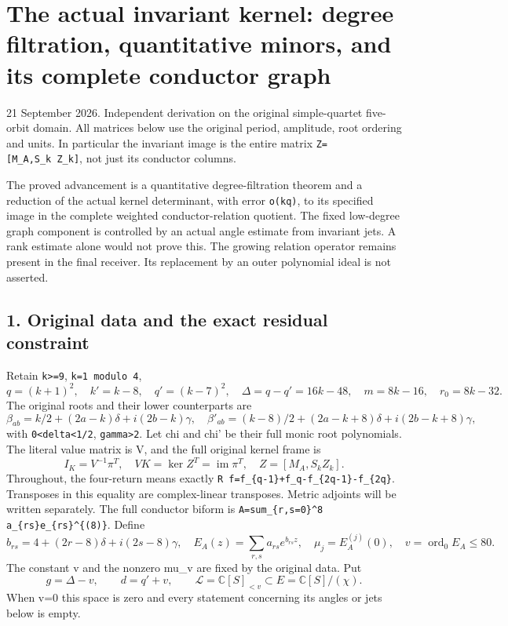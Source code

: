 \section{The actual invariant kernel: degree filtration, quantitative minors, and its complete conductor graph}\label{the-actual-invariant-kernel-degree-filtration-quantitative-minors-and-its-complete-conductor-graph}

21 September 2026. Independent derivation on the original simple-quartet five-orbit domain. All matrices below use the original period, amplitude, root ordering and units. In particular the invariant image is the entire matrix \texttt{Z={[}M\_A,S\_k\ Z\_k{]}}, not just its conductor columns.

The proved advancement is a quantitative degree-filtration theorem and a reduction of the actual kernel determinant, with error \texttt{o(kq)}, to its specified image in the complete weighted conductor-relation quotient. The fixed low-degree graph component is controlled by an actual angle estimate from invariant jets. A rank estimate alone would not prove this. The growing relation operator remains present in the final receiver. Its replacement by an outer polynomial ideal is not asserted.

\subsection{1. Original data and the exact residual constraint}\label{original-data-and-the-exact-residual-constraint}

Retain \texttt{k\textgreater{}=9}, \texttt{k=1\ modulo\ 4}, \[
q=(k+1)^2,\quad k'=k-8,\quad q'=(k-7)^2,\quad
\Delta=q-q'=16k-48,\quad m=8k-16,\quad r_0=8k-32.
\tag{KF1}
\] The original roots and their lower counterparts are \[
\beta_{ab}=k/2+(2a-k)\delta+i(2b-k)\gamma,
\quad
\beta'_{ab}=(k-8)/2+(2a-k+8)\delta+i(2b-k+8)\gamma,
\] with \texttt{0\textless{}delta\textless{}1/2}, \texttt{gamma\textgreater{}2}. Let chi and chi' be their full monic root polynomials. The literal value matrix is V, and the full original kernel frame is \[
I_K=V^{-1}\pi^T,\quad
VK=\ker Z^T=\operatorname{im}\pi^T,
\quad Z=[M_A,S_kZ_k].
\tag{KF2}
\] Throughout, the four-return means exactly \nolinkurl{R f=f_{q-1}+f_q-f_{2q-1}-f_{2q}}. Transposes in this equality are complex-linear transposes. Metric adjoints will be written separately. The full conductor biform is \nolinkurl{A=sum_{r,s=0}^8 a_{rs}e_{rs}^{(8)}}. Define \[
b_{rs}=4+(2r-8)\delta+i(2s-8)\gamma,\quad
E_A(z)=\sum_{r,s}a_{rs}e^{b_{rs}z},\quad
\mu_j=E_A^{(j)}(0),\quad v=\operatorname{ord}_0E_A\le80.
\tag{KF3}
\] The constant v and the nonzero mu\_v are fixed by the original data. Put \[
g=\Delta-v,\qquad d=q'+v,\qquad
\mathcal L=\mathbb C[S]_{<v}\subset E=\mathbb C[S]/(\chi).
\] When v=0 this space is zero and every statement concerning its angles or jets below is empty.

